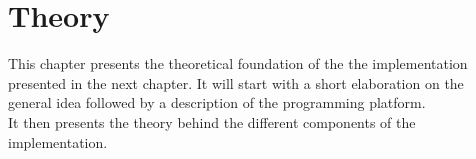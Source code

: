 \chapter{Theory}
\label{chap:theory}




















This chapter presents the theoretical foundation of the the implementation presented in the next chapter.
It will start with a short elaboration on the general idea followed by a description of the
programming platform.\\
It then presents the theory behind the different components of the implementation.

